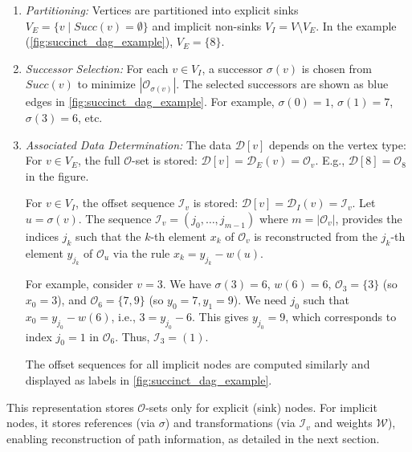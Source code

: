 \begin{enumerate}
    \item \emph{Partitioning:} Vertices are partitioned into explicit sinks $V_E = \{ v \mid Succ(v) = \emptyset \}$ and implicit non-sinks $V_I = V \setminus V_E$. In the example (\autoref{fig:succinct_dag_example}), $V_E=\{8\}$.

    \item \emph{Successor Selection:} For each $v \in V_I$, a successor $\sigma(v)$ is chosen from $Succ(v)$ to minimize $|\mathcal{O}_{\sigma(v)}|$. The selected successors are shown as blue edges in \autoref{fig:succinct_dag_example}. For example, $\sigma(0)=1$, $\sigma(1)=7$, $\sigma(3)=6$, etc.
    \item \emph{Associated Data Determination:} The data $\mathcal{D}[v]$ depends on the vertex type:
          For $v \in V_E$, the full $\mathcal{O}$-set is stored: $\mathcal{D}[v] = \mathcal{D}_E(v) = \mathcal{O}_v$. E.g., $\mathcal{D}[8] = \mathcal{O}_8$ in the figure.

          For $v \in V_I$, the offset sequence $\mathcal{I}_v$ is stored: $\mathcal{D}[v] = \mathcal{D}_I(v) = \mathcal{I}_v$. Let $u = \sigma(v)$. The sequence $\mathcal{I}_v = (j_0, \dots, j_{m-1})$ where $m=|\mathcal{O}_v|$, provides the indices $j_k$ such that the $k$-th element $x_k$ of $\mathcal{O}_v$ is reconstructed from the $j_k$-th element $y_{j_k}$ of $\mathcal{O}_u$ via the rule $x_k = y_{j_k} - w(u)$.

          For example, consider $v=3$. We have $\sigma(3)=6$, $w(6)=6$, $\mathcal{O}_3=\{3\}$ (so $x_0=3$), and $\mathcal{O}_6=\{7, 9\}$ (so $y_0=7, y_1=9$). We need $j_0$ such that $x_0 = y_{j_0} - w(6)$, i.e., $3 = y_{j_0} - 6$. This gives $y_{j_0}=9$, which corresponds to index $j_0=1$ in $\mathcal{O}_6$. Thus, $\mathcal{I}_3 = (1)$.

          The offset sequences for all implicit nodes are computed similarly and displayed as labels in \autoref{fig:succinct_dag_example}.
\end{enumerate}

This representation stores $\mathcal{O}$-sets only for explicit (sink) nodes. For implicit nodes, it stores references (via $\sigma$) and transformations (via $\mathcal{I}_v$ and weights $\mathcal{W}$), enabling reconstruction of path information, as detailed in the next section.



